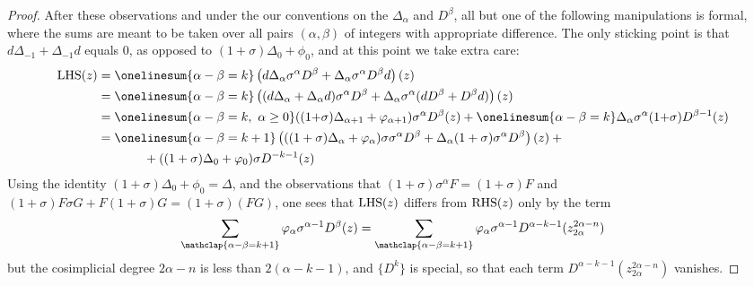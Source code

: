 \documentclass[10pt]{article}
\newcommand{\twist}{\sigma}
\begin{document}
\begin{AdamsSSEQ operations final}
\begin{proof}
After these observations and under the our conventions on the $\Delta_\alpha$ and $D^\beta$, all but one of the following manipulations is formal, where the sums are meant to be taken over all pairs $(\alpha,\beta)$ of integers with appropriate difference. The only sticking point is that $d\Delta_{-1}+\Delta_{-1}d$ equals $0$, as opposed to $(1{+}\twist)\Delta_0+\phi_0$, and at this point we take extra care:
%
\begin{alignat*}{2}
\textup{LHS}(z)
&=
\onelinesum{\alpha-\beta=k}\left(d\Delta_\alpha\twist^\alpha D^\beta+\Delta_\alpha\twist^\alpha D^\beta d\right)(z)%
\\
&=
\onelinesum{\alpha-\beta=k}\left((d\Delta_\alpha+
\Delta_\alpha d)\twist^\alpha D^\beta+
\Delta_\alpha\twist^\alpha (dD^\beta+
D^\beta d)\right)(z)%
\\
&=
\onelinesum{\alpha-\beta=k,\ \alpha\geq0}((1{+}\twist)\Delta_{\alpha+1}+\phi_{\alpha+1})\twist^\alpha D^\beta(z)+ \onelinesum{\alpha-\beta=k} \Delta_\alpha\twist^\alpha(1{+}\twist) D^{\beta-1}(z)%
\\
&=
\onelinesum{\alpha-\beta=k+1} \left(((1+\twist)\Delta_{\alpha}+ \phi_{\alpha})\twist\twist^{\alpha} D^\beta+\Delta_\alpha(1+\twist)\twist^\alpha D^{\beta}\right)(z) + {}%
\\
&\ \ \ \ \ \ \ \ \ \ \ +
((1+\twist)\Delta_{0}+\phi_{0})\twist D^{-k-1}(z)
\end{alignat*}
Using the identity $(1+\twist)\Delta_{0}+\phi_{0}=\Delta$, and the observations that $(1+\twist)\twist^\alpha F=(1+\twist)F$ and $(1+\twist)F\twist G+F(1+\twist)G=(1+\twist)(FG)$, one sees that $\textup{LHS}(z)$ differs from $\textup{RHS}(z)$ only by the term
\[\sum_{\mathclap{\alpha-\beta=k+1}} \phi_{\alpha}\sigma^{\alpha-1}D^{\beta}(z)=\sum_{\mathclap{\alpha-\beta=k+1}} \phi_{\alpha}\sigma^{\alpha-1}D^{\alpha-k-1}(z_{2\alpha}^{2\alpha-n})\]
but the cosimplicial degree $2\alpha-n$ is less than $2(\alpha-k-1)$, and $\{D^k\}$ is special, so that each term $D^{\alpha-k-1}(z_{2\alpha}^{2\alpha-n})$ vanishes.
\end{proof}

















\end{AdamsSSEQ operations final}
\end{document}
